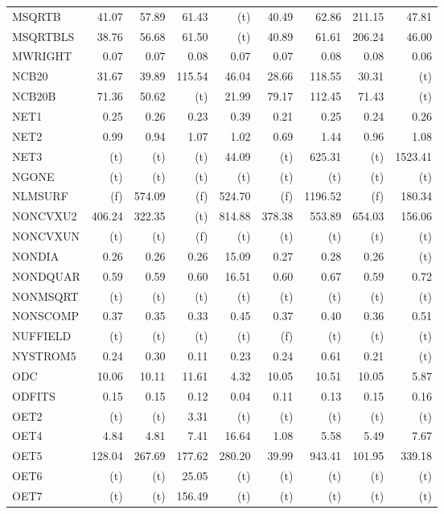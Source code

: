 \documentclass[11pt,twoside]{article}
\begin{document}
{\begin{longtable}[c]{|l|r|r|r|r|r|r|r|r|}
MSQRTB & 41.07 & 57.89 & 61.43 & (t) & 40.49 & 62.86 & 211.15 & 47.81 \\
MSQRTBLS & 38.76 & 56.68 & 61.50 & (t) & 40.89 & 61.61 & 206.24 & 46.00 \\
MWRIGHT & 0.07 & 0.07 & 0.08 & 0.07 & 0.07 & 0.08 & 0.08 & 0.06 \\
NCB20 & 31.67 & 39.89 & 115.54 & 46.04 & 28.66 & 118.55 & 30.31 & (t) \\
NCB20B & 71.36 & 50.62 & (t) & 21.99 & 79.17 & 112.45 & 71.43 & (t) \\
NET1 & 0.25 & 0.26 & 0.23 & 0.39 & 0.21 & 0.25 & 0.24 & 0.26 \\
NET2 & 0.99 & 0.94 & 1.07 & 1.02 & 0.69 & 1.44 & 0.96 & 1.08 \\
NET3 & (t) & (t) & (t) & 44.09 & (t) & 625.31 & (t) & 1523.41 \\
NGONE & (t) & (t) & (t) & (t) & (t) & (t) & (t) & (t) \\
NLMSURF & (f) & 574.09 & (f) & 524.70 & (f) & 1196.52 & (f) & 180.34 \\
NONCVXU2 & 406.24 & 322.35 & (t) & 814.88 & 378.38 & 553.89 & 654.03 & 156.06 \\
NONCVXUN & (t) & (t) & (f) & (t) & (t) & (t) & (t) & (t) \\
NONDIA & 0.26 & 0.26 & 0.26 & 15.09 & 0.27 & 0.28 & 0.26 & (t) \\
NONDQUAR & 0.59 & 0.59 & 0.60 & 16.51 & 0.60 & 0.67 & 0.59 & 0.72 \\
NONMSQRT & (t) & (t) & (t) & (t) & (t) & (t) & (t) & (t) \\
NONSCOMP & 0.37 & 0.35 & 0.33 & 0.45 & 0.37 & 0.40 & 0.36 & 0.51 \\
NUFFIELD & (t) & (t) & (t) & (t) & (f) & (t) & (t) & (t) \\
NYSTROM5 & 0.24 & 0.30 & 0.11 & 0.23 & 0.24 & 0.61 & 0.21 & (t) \\
ODC & 10.06 & 10.11 & 11.61 & 4.32 & 10.05 & 10.51 & 10.05 & 5.87 \\
ODFITS & 0.15 & 0.15 & 0.12 & 0.04 & 0.11 & 0.13 & 0.15 & 0.16 \\
OET2 & (t) & (t) & 3.31 & (t) & (t) & (t) & (t) & (t) \\
OET4 & 4.84 & 4.81 & 7.41 & 16.64 & 1.08 & 5.58 & 5.49 & 7.67 \\
OET5 & 128.04 & 267.69 & 177.62 & 280.20 & 39.99 & 943.41 & 101.95 & 339.18 \\
OET6 & (t) & (t) & 25.05 & (t) & (t) & (t) & (t) & (t) \\
OET7 & (t) & (t) & 156.49 & (t) & (t) & (t) & (t) & (t) \\

\end{longtable}}
\end{document}
